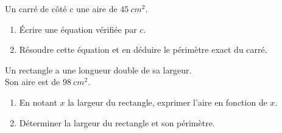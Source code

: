 \begin{exo}
	Un carré de côté $c$ une aire de $\qty{45}{cm^2}$.
	\begin{enumerate}
		\item Écrire une équation vérifiée par $c$.
		\item Résoudre cette équation et en déduire le périmètre exact du carré.
	\end{enumerate}
	Un rectangle a une longueur double de sa largeur.\\ Son aire est de $\qty{98}{cm^2}$.
	\begin{enumerate}
		\item En notant $x$ la largeur du rectangle, exprimer l'aire en fonction de $x$.
		\item Déterminer la largeur du rectangle et son périmètre.
	\end{enumerate}
\end{exo}
